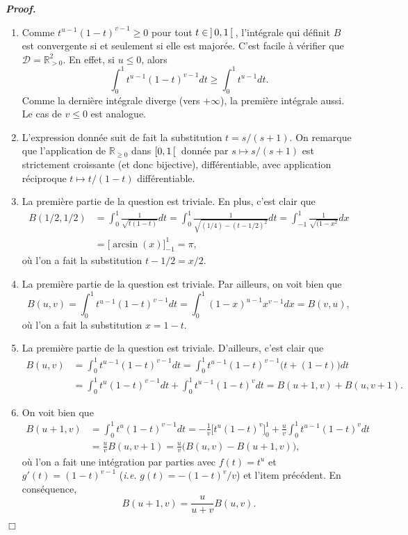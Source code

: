 \documentclass[11pt,a4paper]{article}
\newcommand{\RR}{\mathbb{R}}
\newenvironment{preuve}[1][]
{\vskip 2mm  \noindent\emph{\bf Proof#1. }}{$\Box$ \vskip 2mm}
\let\geq\geqslant
\let\leq\leqslant
\begin{document}
	\begin{preuve}
		\begin{enumerate}
			\item Comme $t^{u-1}(1-t)^{v-1} \geq 0$ pour tout $t \in \hskip 0.6mm]\hskip 0.6mm 0,1\hskip 0.6mm[\hskip 0.6mm$, 
			l'intégrale qui définit $B$ est convergente si et seulement si elle est majorée. 
			C'est facile à vérifier que $\mathcal{D} = \RR^{2}_{>0}$. 
			En effet, si $u \leq 0$, alors 
			\[     \int_0^1 t^{u-1}(1-t)^{v-1}dt \geq \int_0^1t^{u-1}dt.     \]
			Comme la dernière intégrale diverge (vers $+\infty$), la première intégrale aussi. 
			Le cas de $v \leq 0$ est analogue.  
			
			\item L'expression donnée suit de fait la substitution $t = s/(s+1)$. 
			On remarque que l'application de $\RR_{\geq 0}$ dans $[0,1 \hskip 0.6mm [ \hskip 0.6mm $ donnée par $s \mapsto s/(s+1)$ 
			est strictement croissante (et donc bijective), différentiable, avec application réciproque $t \mapsto t/(1-t)$ différentiable. 
			
			\item La première partie de la question est triviale. 
			En plus, c'est clair que 
			\begin{align*}     
			B(1/2,1/2) &= \int_0^1 \frac{1}{\sqrt{t(1-t)}} dt = \int_0^1 \frac{1}{\sqrt{(1/4) - (t-1/2)^{2}}} dt =  \int_{-1}^1 \frac{1}{\sqrt{(1 - x^{2}}} dx 
			\\
			&= \bigg[ \arcsin(x)\bigg]_{-1}^{1} = \pi,     
			\end{align*}
			où l'on a fait la substitution $t-1/2 = x/2$. 
			
			\item La première partie de la question est triviale. 
			Par ailleurs, on voit bien que 
			\[     B(u,v)=\int_0^1t^{u-1}(1-t)^{v-1}dt = \int_0^1 (1-x)^{u-1}x^{v-1}dx = B(v,u),     \]
			où l'on a fait la substitution $x = 1- t$.
			
			\item La première partie de la question est triviale. 
			D'ailleurs, c'est clair que 
			\begin{align*}   
			B(u,v) &= \int_0^1t^{u-1}(1-t)^{v-1}dt = \int_0^1t^{u-1}(1-t)^{v-1} \big(t + (1-t)\big)dt 
			\\
			&= \int_0^1 t^{u}(1-t)^{v-1}dt + \int_0^1t^{u-1}(1-t)^{v}dt = B(u+1,v)+B(u,v+1).  
			\end{align*}
			
			\item On voit bien que 
			\begin{align*}     
			B(u+1,v)&=\int_0^1t^{u}(1-t)^{v-1}dt = - \frac{1}{v} \bigg[ t^{u}(1-t)^{v} \bigg]_0^1 + \frac{u}{v} \int_0^1t^{u-1}(1-t)^{v}dt 
			\\ 
			&= \frac{u}{v} B(u,v+1) = \frac{u}{v} \big(B(u,v) - B(u+1,v)\big),     
			\end{align*}
			où l'on a fait une intégration par parties avec $f(t) = t^{u}$ et $g'(t) = (1-t)^{v-1}$ (\textit{i.e.} $g(t) = -(1-t)^{v}/v$) et l'item précédent. 
			En conséquence, 
			\[     B(u+1,v)=\frac {u}{u+v}B(u,v).     \]   
			

\end{enumerate}
\end{preuve}
\end{document}
